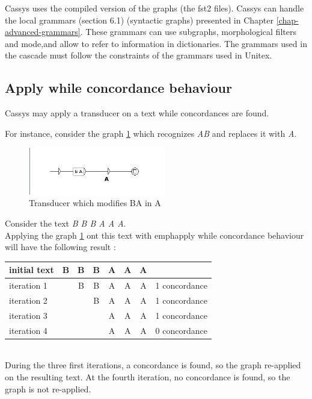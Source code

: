Cassys uses the compiled version of the graphs (the fst2 files).
Cassys can handle the local grammars (section 6.1) (syntactic graphs) presented in Chapter \ref{chap-advanced-grammars}. These grammars can use subgraphs, 
morphological filters and mode,and allow to refer to information in dictionaries. 
The grammars used in the cascade must follow the constraints of the grammars used in Unitex.


\subsection{Apply while concordance behaviour}
\label{sub:AppWhiCon}

Cassys may apply a transducer on a text while concordances are found. 

For
instance, consider the graph \ref{fig:AB->A} which recognizes \emph{AB} and
replaces it with \emph{A}. 

\begin{figure}[!htb]
  \centering
  \includegraphics[width=6cm]{resources/img/AB_to_A.png}
  \caption{Transducer which modifies BA in A}
  \label{fig:AB->A}
\end{figure}

Consider the text \emph{B B B A A A}. \\

Applying the graph \ref{fig:AB->A} ont this text with emph{apply while
concordance behaviour} will have the following result :\\

\begin{tabular}{|l|cccccc|r|}
\hline
initial text  &B&B&B&A&A&A&\\
\hline
iteration 1 & &B&B&A&A&A& 1 concordance\\
iteration 2 & & &B&A&A&A& 1 concordance\\
iteration 3 & & & &A&A&A& 1 concordance\\
iteration 4 & & & &A&A&A& 0 concordance\\
\hline
\end{tabular} \\

During the three first iterations, a concordance is found, so the graph
re-applied on the resulting text. At the fourth iteration, no concordance is
found, so the graph is not re-applied.

